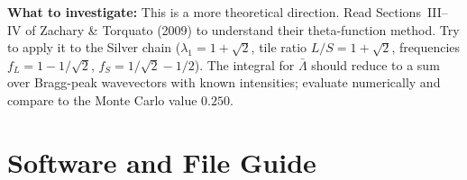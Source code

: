 \documentclass[11pt,letterpaper]{article}
\begin{document}
\textbf{What to investigate:}
This is a more theoretical direction. Read Sections~III--IV of Zachary \& Torquato (2009)
to understand their theta-function method. Try to apply it to the Silver chain
($\lambda_1=1+\sqrt2$, tile ratio $L/S=1+\sqrt2$, frequencies $f_L=1-1/\sqrt2$, $f_S=1/\sqrt2-1/2$).
The integral for $\bar\Lambda$ should reduce to a sum over Bragg-peak wavevectors with known
intensities; evaluate numerically and compare to the Monte Carlo value $0.250$.

\section{Software and File Guide}
\end{document}
